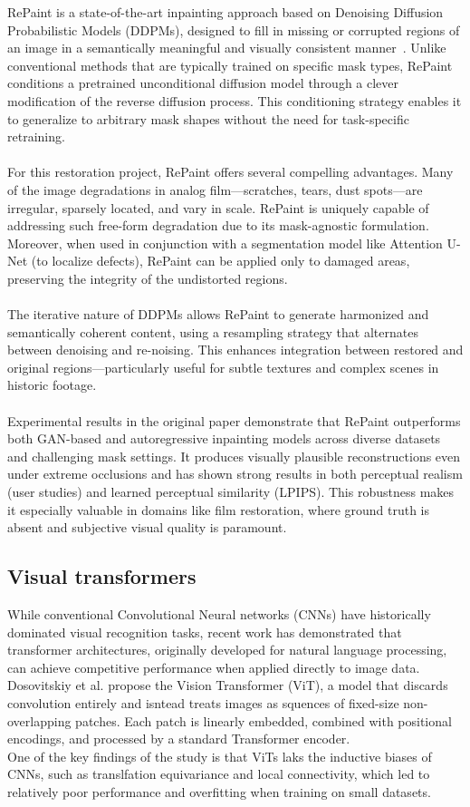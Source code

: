 \documentclass[openany, 12pt]{article}
\begin{document}
{	RePaint is a state-of-the-art inpainting approach based on Denoising Diffusion Probabilistic Models (DDPMs), designed to fill in missing or corrupted regions of an image in a semantically meaningful and visually consistent manner~\cite{lugmayr_repaint_2022}. Unlike conventional methods that are typically trained on specific mask types, RePaint conditions a pretrained unconditional diffusion model through a clever modification of the reverse diffusion process. This conditioning strategy enables it to generalize to arbitrary mask shapes without the need for task-specific retraining.\\
	\\
	For this restoration project, RePaint offers several compelling advantages. Many of the image degradations in analog film—scratches, tears, dust spots—are irregular, sparsely located, and vary in scale. RePaint is uniquely capable of addressing such free-form degradation due to its mask-agnostic formulation. Moreover, when used in conjunction with a segmentation model like Attention U-Net (to localize defects), RePaint can be applied only to damaged areas, preserving the integrity of the undistorted regions.\\
	\\
	The iterative nature of DDPMs allows RePaint to generate harmonized and semantically coherent content, using a resampling strategy that alternates between denoising and re-noising. This enhances integration between restored and original regions—particularly useful for subtle textures and complex scenes in historic footage.\\
	\\
	Experimental results in the original paper demonstrate that RePaint outperforms both GAN-based and autoregressive inpainting models across diverse datasets and challenging mask settings. It produces visually plausible reconstructions even under extreme occlusions and has shown strong results in both perceptual realism (user studies) and learned perceptual similarity (LPIPS). This robustness makes it especially valuable in domains like film restoration, where ground truth is absent and subjective visual quality is paramount.
	}
\subsection{Visual transformers}
While conventional Convolutional Neural networks (CNNs) have historically dominated visual recognition tasks, recent work has demonstrated that transformer architectures, originally developed for natural language processing, can achieve competitive performance when applied directly to image data. Dosovitskiy et al. propose the Vision Transformer (ViT), a model that discards convolution entirely and isntead treats images as squences of fixed-size non-overlapping patches. Each patch is linearly embedded, combined with positional encodings, and processed by a standard Transformer encoder.\\
One of the key findings of the study is that ViTs laks the inductive biases of CNNs, such as translfation equivariance and local connectivity, which led to relatively poor performance and overfitting when training on small datasets. \cite{dosovitskiy2021imageworth16x16words}
\end{document}
